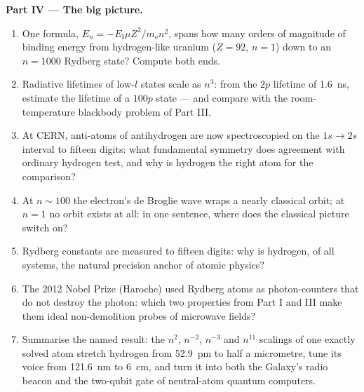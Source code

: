 \begin{problem}
\medskip\noindent\textbf{Part IV --- The big picture.}
\begin{enumerate}[resume]
  \item One formula, $E_n = -E_{\text{I}}\mu Z^2/m_{\text{e}}n^2$,
        spans how many orders of magnitude of binding energy from
        hydrogen-like uranium ($Z = 92$, $n = 1$) down to an
        $n = 1000$ Rydberg state? Compute both ends.
  \item Radiative lifetimes of low-$l$ states scale as $n^3$: from
        the $2p$ lifetime of \qty{1.6}{ns}, estimate the lifetime
        of a $100p$ state --- and compare with the room-temperature
        blackbody problem of Part III.
  \item At CERN, anti-atoms of antihydrogen are now spectroscopied
        on the $1s \to 2s$ interval to fifteen digits: what
        fundamental symmetry does agreement with ordinary hydrogen
        test, and why is hydrogen the right atom for the
        comparison?
  \item At $n \sim 100$ the electron's de Broglie wave wraps a
        nearly classical orbit; at $n = 1$ no orbit exists at all:
        in one sentence, where does the classical picture switch
        on?
  \item Rydberg constants are measured to fifteen digits: why is
        hydrogen, of all systems, the natural precision anchor of
        atomic physics?
  \item The 2012 Nobel Prize (Haroche) used Rydberg atoms as
        photon-counters that do not destroy the photon: which two
        properties from Part I and III make them ideal
        non-demolition probes of microwave fields?
  \item Summarise the named result: the $n^2$, $n^{-2}$, $n^{-3}$
        and $n^{11}$ scalings of one exactly solved atom stretch
        hydrogen from \qty{52.9}{pm} to half a micrometre, tune its
        voice from \qty{121.6}{nm} to \qty{6}{cm}, and turn it into
        both the Galaxy's radio beacon and the two-qubit gate of
        neutral-atom quantum computers.
\end{enumerate}
\end{problem}
